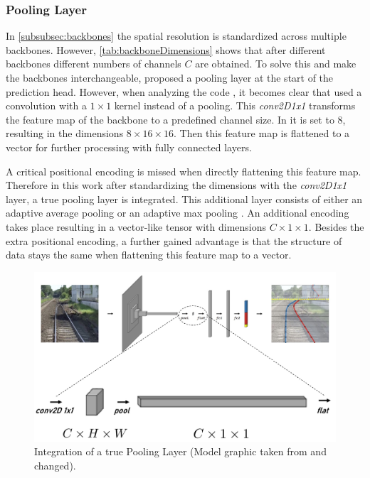 \subsubsection{Pooling Layer}
\label{subsubsec:pooling}

In \autoref{subsubsec:backbones} the spatial resolution is standardized across multiple backbones.
However, \autoref{tab:backboneDimensions} shows that after different backbones different numbers of channels $C$ are obtained.
To solve this and make the backbones interchangeable, \cite{tepNet2024} proposed a pooling layer at the start of the prediction head.
However, when analyzing the code \cite{tepNet2024GitHub}, it becomes clear that \cite{tepNet2024} used a convolution with a $1 \times 1$ kernel instead of a pooling.
This \textit{conv2D1x1} transforms the feature map of the backbone to a predefined channel size.
In \cite{tepNet2024GitHub} it is set to 8, resulting in the dimensions $8 \times 16 \times 16$.
Then this feature map is flattened to a vector for further processing with fully connected layers.

A critical positional encoding is missed when directly flattening this feature map.
Therefore in this work after standardizing the dimensions with the \textit{conv2D1x1} layer, a true pooling layer is integrated.
This additional layer consists of either an adaptive average pooling \cite{pytorch_averagePool_docu} or an adaptive max pooling \cite{pytorch_maxPool_docu}.
An additional encoding takes place resulting in a vector-like tensor with dimensions $C \times 1 \times 1$.
Besides the extra positional encoding, a further gained advantage is that the structure of data stays the same when flattening this feature map to a vector.

\begin{figure}[H]
    \centering
    \includegraphics[width=0.75\linewidth]{PICs/improvedModel/poolingLayers.jpg}
    \caption{Integration of a true Pooling Layer (Model graphic taken from \cite{tepNet2024} and changed).}
    \label{fig:truePoolingLayer}
\end{figure}

